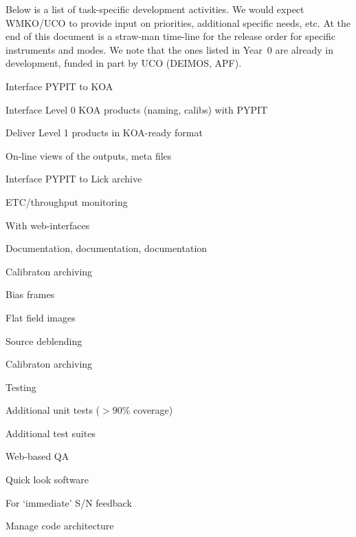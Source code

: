 \documentclass[11pt,preprint]{aastex}
\newenvironment{my_enumerate}{
\begin{enumerate}
  \setlength{\itemsep}{1pt}
  \setlength{\parskip}{0pt}
  \setlength{\parsep}{0pt}}{\end{enumerate}
}
\begin{document}
Below is a list of task-specific development activities.
We would expect WMKO/UCO to provide input on priorities,
additional specific needs, etc.  At the end of this
document is a straw-man time-line for the release
order for specific instruments and modes.  We note
that the ones listed in Year~0 are already in development,
funded in part by UCO (DEIMOS, APF).  


\begin{my_enumerate}
\item Interface PYPIT to KOA
  \begin{my_enumerate}
  \item Interface Level 0 KOA products (naming, calibs) with PYPIT
  \item Deliver Level 1 products in KOA-ready format
  \item On-line views of the outputs, meta files
  \end{my_enumerate}
\item Interface PYPIT to Lick archive
\item ETC/throughput monitoring
  \begin{my_enumerate}
  \item With web-interfaces
  \end{my_enumerate}
\item Documentation, documentation, documentation
\item Calibraton archiving
  \begin{my_enumerate}
  \item Bias frames
  \item Flat field images
  \end{my_enumerate}
\item Source deblending
\item Calibraton archiving
\item Testing 
  \begin{my_enumerate}
  \item Additional unit tests ($>90\%$ coverage)
  \item Additional test suites
  \end{my_enumerate}
\item Web-based QA
\item Quick look software 
  \begin{my_enumerate}
  \item For `immediate' S/N feedback
  \end{my_enumerate}
\item Manage code architecture
\end{my_enumerate}
\end{document}
